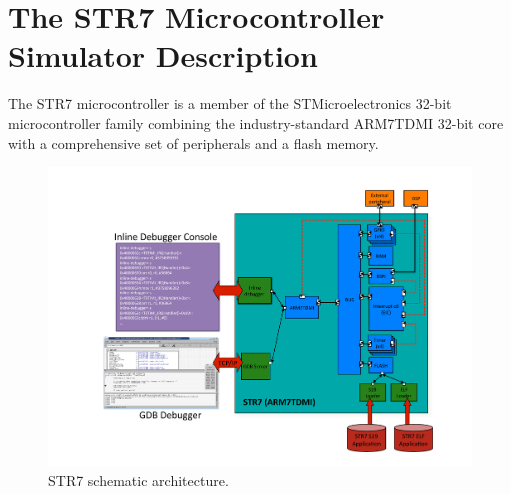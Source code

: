 \section{The STR7 Microcontroller Simulator Description}
\label{sec:str7_validation_description}

The STR7 microcontroller is a member of the STMicroelectronics 32-bit microcontroller family combining the industry-standard ARM7TDMI 32-bit core with a comprehensive set of peripherals and a flash memory.

\begin{figure}[!h]
	\begin{center}
		\includegraphics[width=\textwidth]{str7_validation/figures/str7_architecture.pdf}
	\end{center}
	\caption{STR7 schematic architecture.}
	\label{fig:str7_validation_str7_architecture}
\end{figure}

